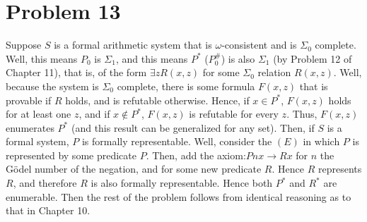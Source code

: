 \documentclass{article}
\theoremstyle{definition}
\begin{document}
\section*{Problem 13}
Suppose $S$ is a formal arithmetic system that is $\omega$-consistent and is $\Sigma_0$ complete. Well, this means $P_0$ is $\Sigma_1$, and this means 
$P^*$ ($P_0^\#$) is also $\Sigma_1$ (by Problem 12 of Chapter 11), that is, of the form $\exists zR(x,z)$ for some $\Sigma_0$ relation 
$R(x,z)$. Well, because the system is $\Sigma_0$ complete, there is some formula $F(x,z)$ that is provable if $R$ holds, and is 
refutable otherwise. Hence, if $x\in P^*$, $F(x,z)$ holds for at least one $z$, and if $x\notin P^*$, $F(x,z)$ is refutable for every $z$. Thus, $F(x,z)$ 
enumerates $P^*$ (and this result can be generalized for any set). 
Then, if $S$ is a formal system, $P$ is formally representable. Well, consider the $(E)$ in which $P$ is represented by some predicate 
$P$. Then, add the axiom:\newline $Pnx\rightarrow Rx$ for $n$ the Gödel number of the negation, and for some new predicate $R$. Hence $R$ represents $R$, 
and therefore $R$ is also formally representable. Hence both $P^*$ and $R^*$ are enumerable. Then the rest of the problem follows from identical reasoning 
as to that in Chapter 10. 
\end{document}
